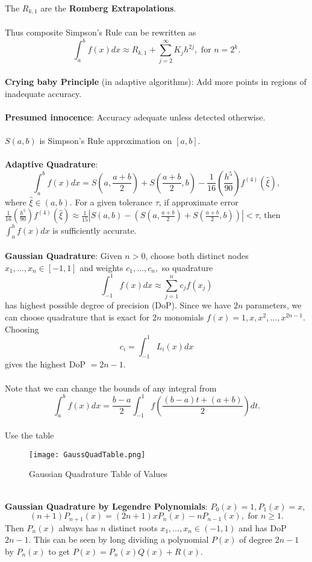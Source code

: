 \documentclass{article}
\begin{document}
The $R_{k, 1}$ are the \textbf{Romberg Extrapolations}. \\ \\
Thus composite Simpson's Rule can be rewritten as $$\int_a^b f(x)dx \approx R_{k, 1} + \sum_{j = 2}^\infty K_j h^{2j}, \text{ for } n = 2^k.$$ \\
\textbf{Crying baby Principle} (in adaptive algorithms): Add more points in regions of inadequate accuracy. \\ \\
\textbf{Presumed innocence}: Accuracy adequate unless detected otherwise. \\ \\
$S(a, b)$ is Simpson’s Rule approximation on $[a, b]$. \\ \\
\textbf{Adaptive Quadrature}: $$\int_a^b f(x)dx = S(a, \frac{a + b}{2}) + S(\frac{a + b}{2}, b) - \frac{1}{16} \left( \frac{h^5}{90} \right) f^{(4)} (\hat{\xi}),$$ where $\hat{\xi} \in (a, b)$. For a given tolerance $\tau$, if approximate error $\frac{1}{16} \left( \frac{h^5}{90} \right) f^{(4)} (\hat{\xi}) \approx \frac{1}{15}|S(a, b) - (S(a, \frac{a + b}{2}) + S(\frac{a + b}{2}, b))| < \tau$, then $\int_a^b f(x)dx$ is sufficiently accurate. \\ \\
\textbf{Gaussian Quadrature}: Given $n > 0$, choose both distinct nodes $x_1, \dots, x_n \in [-1, 1]$ and weights $c_1, \dots, c_n,$ so quadrature $$\int_{-1}^1 f(x)dx \approx \sum_{j = 1}^n c_j f(x_j)$$ has highest possible degree of precision (DoP). Since we have $2n$ parameters, we can choose quadrature that is exact for $2n$ monomials $f(x) = 1, x, x^2, \dots, x^{2n - 1}$. Choosing $$c_i = \int_{-1}^1 L_i(x) dx$$ gives the highest DoP $= 2n - 1$. \\ \\
Note that we can change the bounds of any integral from $$\int_a^b f(x)dx = \frac{b - a}{2}\int_{-1}^1 f\left( \frac{(b - a)t + (a + b)}{2} \right)dt.$$ \\
Use the table \begin{figure*}[htp]
    \centering
    \texttt{[image: GaussQuadTable.png]}
    \caption{Gaussian Quadrature Table of Values}
\end{figure*} \\
\textbf{Gaussian Quadrature by Legendre Polynomials}: $P_0(x) = 1, P_1(x) = x,$ $$(n + 1)P_{n + 1}(x) = (2n + 1)xP_n(x) - nP_{n - 1}(x), \text{ for } n \geq 1.$$ Then $P_n(x)$ always has $n$ distinct roots $x_1, \dots, x_n \in (-1, 1)$ and has DoP $2n - 1$. This can be seen by long dividing a polynomial $P(x)$ of degree $2n - 1$ by $P_n(x)$ to get $P(x) = P_n(x)Q(x) + R(x)$. \\ \\
\end{document}
